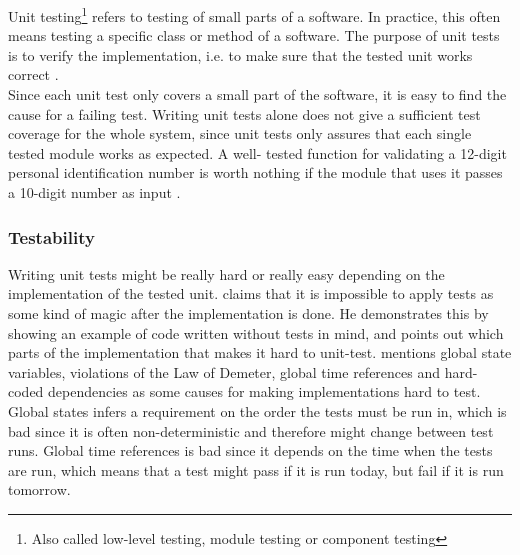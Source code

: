 \MakeShortVerb{\|}


Unit testing\footnote{Also called low-level testing, module testing or
component testing} refers to testing of small parts of a software. In
practice, this often means testing a specific class or method of a
software. The purpose of unit tests is to verify the implementation,
i.e. to make sure that the tested unit works correct
\cite{book:pfleeger}.\\

Since each unit test only covers a small part of the software, it is
easy to find the cause for a failing test. Writing unit tests alone does
not give a sufficient test coverage for the whole system, since unit
tests only assures that each single tested module works as expected. A
well- tested function for validating a 12-digit personal identification
number is worth nothing if the module that uses it passes a 10-digit
number as input \cite{wiki:unittests}.\\


\subsubsection{Testability}

Writing unit tests might be really hard or really easy depending on the
implementation of the tested unit. \citet{video:misko_psychology} claims
that it is impossible to apply tests as some kind of magic after the
implementation is done. He demonstrates this by showing an example of
code written without tests in mind, and points out which parts of the
implementation that makes it hard to unit-test.
\citeauthor{video:misko_psychology} mentions global state variables,
violations of the Law of Demeter, global time references
and hard-coded dependencies as some causes for making implementations
hard to test.\\

Global states infers a requirement on the order the tests
must be run in, which is bad since it is often non-deterministic and
therefore might change between test runs. Global time references is bad
since it depends on the time when the tests are run, which means that a
test might pass if it is run today, but fail if it is run tomorrow.\\


